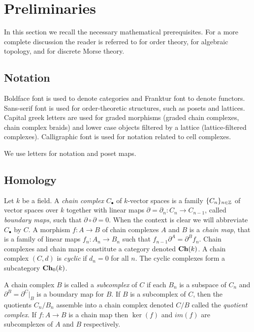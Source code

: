 

\section{Preliminaries}\label{sec:prelims}

In this section we recall  the necessary mathematical prerequisites.   For a more complete discussion the reader is referred to \cite{davey:priestley, roman} for order theory, \cite{lefschetz, gelfand, weibel} for algebraic topology, and \cite{**} for discrete Morse theory.


\subsection{Notation}

Boldface font is used to denote categories and Franktur font to denote functors.  Sans-serif font is used for order-theoretic structures, such as posets and lattices.  Capital greek letters are used for graded morphisms (graded chain complexes, chain complex braids) and lower case objects filtered by a lattice (lattice-filtered complexes).  Calligraphic font is used for notation related to cell complexes.

We use letters for notation and poset maps.

\subsection{Homology}\label{sec:prelims:AT}

Let $k$ be a field.  
A {\em chain complex} $C_\bullet$ of $k$-vector spaces is a family $\{C_n\}_{n\in {\mathbb{Z}}}$ of vector spaces over $k$ together with linear maps $\partial=\partial_n \colon C_n\to C_{n-1}$, called \emph{boundary maps}, such that $\partial\circ\partial =0$.  
When the context is clear we will abbreviate $C_\bullet$ by $C$. 
A morphism $f\colon A\to B$ of chain complexes $A$ and $B$ is a {\em chain map}, that is a family of linear maps $f_n \colon A_n\to B_n$ such that $f_{n-1}\partial^A = \partial^B f_n$. 
Chain complexes and chain maps constitute a category denoted ${\bf Ch}(k)$.  A chain complex $(C,d)$ is {\em cyclic} if $d_n=0$ for all $n$.  The cyclic complexes form a subcategory ${\bf Ch}_0(k)$.  

A chain complex $B$ is called a {\em subcomplex} of $C$ if each $B_n$ is a subspace of $C_n$ and $\partial^B= \partial^C |_B$ is a boundary map for $B$.    
If $B$ is a subcomplex of $C$, then the quotients $C_n/B_n$ assemble into a chain complex denoted $C/B$ called the {\em quotient complex}.   If $f:A\to B$ is a chain map then $\ker(f)$ and $im(f)$ are subcomplexes of $A$ and $B$ respectively.

